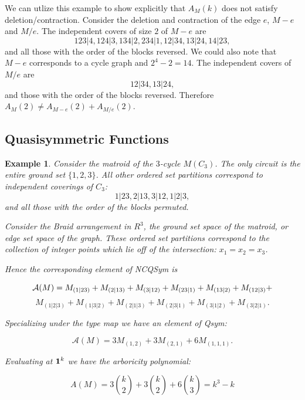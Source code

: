 \documentclass[11pt,letter]{amsart}
\newtheorem{example}[definition]{Example}
\begin{document}
We can utlize this example to show explicitly that $A_M(k)$ does not
satisfy deletion/contraction.  Consider the deletion and contraction
of the edge $e$, $M-e$ and $M/e$.  The independent covers of size $2$
of $M-e$ are
$$ 123|4, 124|3, 134|2, 234|1, 12|34, 13|24, 14|23, $$ and all those
with the order of the blocks reversed.  We could also note that $M-e$
corresponds to a cycle graph and $2^4 - 2 = 14$.  The independent
covers of $M/e$ are $$12|34, 13|24,$$ and those with the order of the
blocks reversed.  Therefore $A_M(2) \neq A_{M-e}(2) + A_{M/e}(2)$.




\subsection{Quasisymmetric Functions}



\begin{example}

Consider the matroid of the $3$-cycle $M(C_3)$.  The only circuit is the entire ground set $\{1,2,3\}$.  All other ordered set partitions correspond to independent coverings of $C_3$: 
$$1|23, 2|13, 3|12, 1|2|3,$$
and all those with the order of the blocks permuted. 

Consider the Braid arrangement in $R^3$, the ground set space of the
matroid, or edge set space of the graph.  These ordered set partitions
correspond to the collection of integer points which lie off of the
intersection: $x_1 = x_2 = x_3$.


 Hence the corresponding element of NCQSym is 

$${\bf{{\mathcal A}}}(M) = M_{(1|23)} + M_{(2|13)} + M_{(3|12)} + M_{(23|1)} + M_{(13|2)} +  M_{(12|3)} + $$ $$ M_{(1|2|3)} + M_{(1|3|2)}
+ M_{(2|1|3)} + M_{(2|3|1)} + M_{(3|1|2)} + M_{(3|2|1)}. $$

\noindent Specializing under the type map we have an element of Qsym:

$${\mathcal A}(M) = 3 M_{(1,2)} + 3 M_{(2,1)} + 6 M_{(1,1,1)}. $$

\noindent Evaluating at ${\bf 1}^k $ we have the arboricity polynomial:

$$ A(M) = 3 { k \choose 2} + 3 { k \choose 2} + 6 { k \choose 3} = k^3 - k $$

\end{example}





\end{document}
